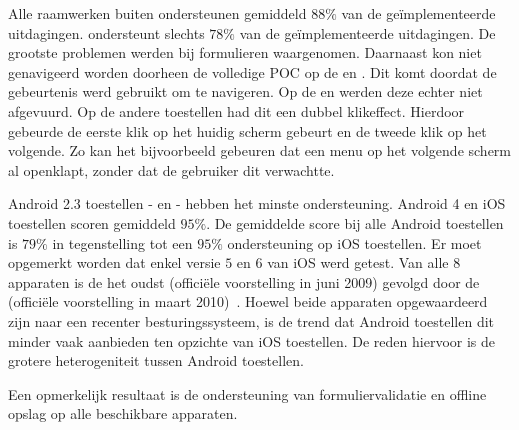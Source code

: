 Alle raamwerken buiten \lungo{} ondersteunen gemiddeld $88\%$ van de geïmplementeerde uitdagingen.
\lungo{} ondersteunt slechts $78\%$ van de geïmplementeerde uitdagingen.
De grootste problemen werden bij formulieren waargenomen.
Daarnaast kon niet genavigeerd worden doorheen de volledige POC op de \htc{} en \gtab{}. 
Dit komt doordat de  gebeurtenis werd gebruikt om te navigeren.
Op de \htc{} en \gtab{} werden deze echter niet afgevuurd.
Op de andere toestellen had dit een dubbel klikeffect.
Hierdoor gebeurde de eerste klik op het huidig scherm gebeurt en de tweede klik op het volgende.
Zo kan het bijvoorbeeld gebeuren dat een menu op het volgende scherm al openklapt, zonder dat de gebruiker dit verwachtte.

Android 2.3 toestellen - \htc{} en \gtab{} - hebben het minste ondersteuning.
Android 4 en iOS toestellen scoren gemiddeld $95\%$.
De gemiddelde score bij alle Android toestellen is $79\%$ in tegenstelling tot een $95\%$ ondersteuning op iOS toestellen.
Er moet opgemerkt worden dat enkel versie $5$ en $6$ van iOS werd getest.
Van alle $8$ apparaten is de \iphoneiii{} het oudst (officiële voorstelling in juni 2009) gevolgd door de \gs{} (officiële voorstelling in maart 2010)~\cite{Staff2009,Gideon2010}.
Hoewel beide apparaten opgewaardeerd zijn naar een recenter besturingssysteem, is de trend dat Android toestellen dit minder vaak aanbieden ten opzichte van iOS toestellen. %
De reden hiervoor is de grotere heterogeniteit tussen Android toestellen.


Een opmerkelijk resultaat is de ondersteuning van formuliervalidatie en offline opslag op alle beschikbare apparaten.


